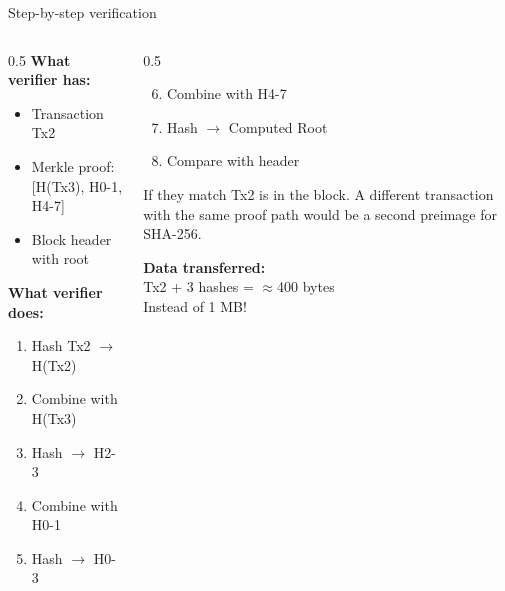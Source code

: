 \ifdefined\PRESENTATION\else\PassOptionsToClass{handout}{beamer}\fi\documentclass[aspectratio=169, lualatex]{beamer}
\begin{document}
\begin{frame}{Step-by-step verification}
	\begin{columns}[c]
		\begin{column}{0.5\textwidth}
			\textbf{What verifier has:}
			\begin{itemize}
				\item Transaction Tx2
				\item Merkle proof: [H(Tx3), H0-1, H4-7]
				\item Block header with root
			\end{itemize}
			\textbf{What verifier does:}
			\begin{enumerate}
				\item Hash Tx2 $\rightarrow$ H(Tx2)
				\item Combine with H(Tx3)
				\item Hash $\rightarrow$ H2-3
				\item Combine with H0-1
				\item Hash $\rightarrow$ H0-3
			\end{enumerate}
		\end{column}
		\begin{column}{0.5\textwidth}
			\begin{enumerate}
				\setcounter{enumi}{5}
				\item Combine with H4-7
				\item Hash $\rightarrow$ Computed Root
				\item Compare with header
			\end{enumerate}
			\begin{alertblock}{If they match}
				Tx2 is in the block. A different transaction with the same proof path would be a second preimage for SHA-256.
			\end{alertblock}
			\textbf{Data transferred:}\\
			Tx2 + 3 hashes = $\approx$400 bytes\\
			Instead of 1 MB!
		\end{column}
	\end{columns}
\end{frame}
\end{document}
